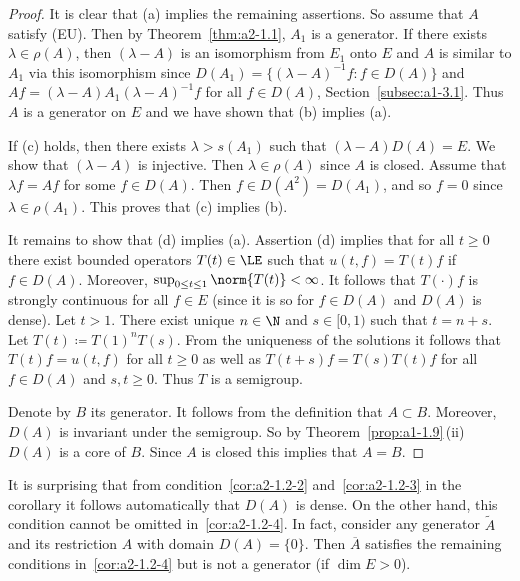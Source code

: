 \begin{proof}
It is clear that (a) implies the remaining assertions.
So assume that $A$ satisfy (EU).
Then by Theorem~\ref{thm:a2-1.1}, $A_{1}$ is a generator.
If there exists $\lambda \in \rho(A)$, then $(\lambda-A)$ is an isomorphism from $E_{1}$ onto $E$ and $A$ is similar to $A_{1}$ via this isomorphism since 
$D(A_{1}) = \{(\lambda-A)^{-1}f \colon f \in D(A)\}$ and $Af = (\lambda-A)A_{1}(\lambda-A)^{-1}f$ for all $f \in D(A)$, 
Section~\ref{subsec:a1-3.1}.
Thus $A$ is a generator on $E$ and we have shown that (b) implies (a).   

If (c)  holds, then there exists $\lambda > s(A_{1})$ such that $(\lambda-A)D(A) = E$.
We show that $(\lambda-A)$ is injective.
Then $\lambda \in \rho(A)$ since $A$ is closed.
Assume that $\lambda f = Af$ for some $f \in D(A)$.
Then $f \in D(A^{2}) = D(A_{1})$, and so $f = 0$ since $\lambda \in \rho(A_{1})$.
This proves that (c) implies (b).  

It remains to show that (d)  implies (a). 
Assertion (d) implies that for all $ t \geq 0 $ there exist bounded operators $ T(t) \in \LE $ such that $ u(t,f) = T(t)f $ if\/ $ f \in D(A) $.
Moreover, $ \sup_{0 \leq t \leq 1} \norm{T(t)} < \infty $.
It follows that $ T(\cdot)f $ is strongly continuous for all $ f \in E $ (since it is so for $ f \in D(A) $ and $ D(A) $ is dense).
Let $ t > 1 $.
There exist unique $ n \in \N $ and $ s \in [0,1) $ such that $ t = n + s $.
Let $ T(t) \coloneqq T(1)^{n}T(s) $.
From the uniqueness of the solutions it follows that $ T(t)f = u(t,f) $ for all $ t \geq 0 $ as well as $ T(t+s)f = T(s)T(t)f $ for all $ f \in D(A) $ and $ s,t \geq 0 $.
Thus $ T $ is a semigroup.

Denote by $ B $ its generator.
It follows from the definition that $ A \subset B $.
Moreover, $ D(A) $ is invariant under the semigroup.
So by Theorem~\ref{prop:a1-1.9}\,(ii) $ D(A) $ is a core of\/ $ B $.
Since $ A $ is closed this implies that $ A = B $.
\end{proof}
\begin{remark}\label{rem:a2-1.3}
It is surprising that from condition~\ref{cor:a2-1.2-2}   and~\ref{cor:a2-1.2-3}   in the corollary it follows automatically that $ D(A) $ is dense.
On the other hand, this condition cannot be omitted in~\ref{cor:a2-1.2-4}.   
In fact, consider any generator $ \tilde{A} $ and its restriction $ A $ with domain $ D(A) = \{0\} $.
Then $ \overline{A} $ satisfies the remaining conditions in~\ref{cor:a2-1.2-4} but is not a generator (if\/ $ \dim E > 0 $).
\end{remark}
